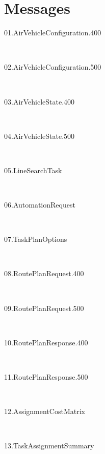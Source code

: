\chapter{Messages}
\begin{fullwidth}
	
		\begin{multicols*}{2}
\begin{description}
	\item[\hypertarget{msg:01.AirVehicleConfiguration.400}{01.AirVehicleConfiguration.400}]  \hfill \ 
	\item[\hypertarget{msg:02.AirVehicleConfiguration.500}{02.AirVehicleConfiguration.500}]  \hfill \ 
	\item[\hypertarget{msg:03.AirVehicleState.400}{03.AirVehicleState.400}]  \hfill \ 
	\item[\hypertarget{msg:04.AirVehicleState.500}{04.AirVehicleState.500}]  \hfill \ 
	\item[\hypertarget{msg:05.LineSearchTask}{05.LineSearchTask}]  \hfill \ 
	\item[\hypertarget{msg:06.AutomationRequest}{06.AutomationRequest}]  \hfill \ 
	\item[\hypertarget{msg:07.TaskPlanOptions}{07.TaskPlanOptions}]  \hfill \ 
	\item[\hypertarget{msg:08.RoutePlanRequest.400}{08.RoutePlanRequest.400}]  \hfill \ 
	\item[\hypertarget{msg:09.RoutePlanRequest.500}{09.RoutePlanRequest.500}]  \hfill \ 
	\item[\hypertarget{msg:10.RoutePlanResponse.400}{10.RoutePlanResponse.400}]  \hfill \ 
	\item[\hypertarget{msg:11.RoutePlanResponse.500}{11.RoutePlanResponse.500}]  \hfill \ 
	\item[\hypertarget{msg:12.AssignmentCostMatrix}{12.AssignmentCostMatrix}]  \hfill \ 
	\item[\hypertarget{msg:13.TaskAssignmentSummary}{13.TaskAssignmentSummary}]  \hfill \ 

\end{description}
\end{multicols*}
\end{fullwidth}
